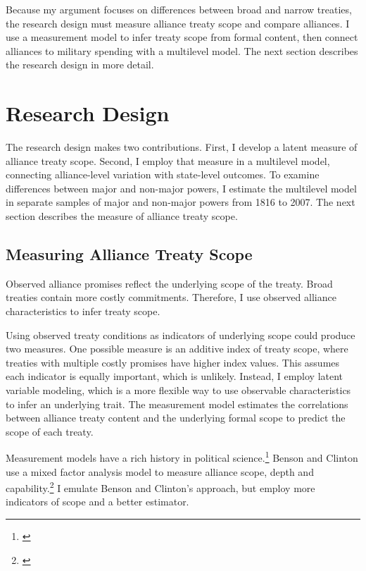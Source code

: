 \documentclass[12pt]{article}
\begin{document}
Because my argument focuses on differences between broad and narrow treaties, the research design must measure alliance treaty scope and compare alliances.  
I use a measurement model to infer treaty scope from formal content, then connect alliances to military spending with a multilevel model. 
The next section describes the research design in more detail. 



\section{Research Design} 


The research design makes two contributions. 
First, I develop a latent measure of alliance treaty scope. 
Second, I employ that measure in a multilevel model, connecting alliance-level variation with state-level outcomes. 
To examine differences between major and non-major powers, I estimate the multilevel model in separate samples of major and non-major powers from 1816 to 2007. 
The next section describes the measure of alliance treaty scope. 


\subsection{Measuring Alliance Treaty Scope} 


Observed alliance promises reflect the underlying scope of the treaty. 
Broad treaties contain more costly commitments. 
Therefore, I use observed alliance characteristics to infer treaty scope.


Using observed treaty conditions as indicators of underlying scope could produce two measures. 
One possible measure is an additive index of treaty scope, where treaties with multiple costly promises have higher index values. 
This assumes each indicator is equally important, which is unlikely. 
Instead, I employ latent variable modeling, which is a more flexible way to use observable characteristics to infer an underlying trait.  
The measurement model estimates the correlations between alliance treaty content and the underlying formal scope to predict the scope of each treaty. 


Measurement models have a rich history in political science.\footnote{\cite{Clintonetal2004, TreierJackman2008, Fariss2014}}
Benson and Clinton use a mixed factor analysis model to measure alliance scope, depth and capability.\footnote{\cite{BensonClinton2016, Quinn2004}} 
I emulate Benson and Clinton's approach, but employ more indicators of scope and a better estimator. 
\end{document}

